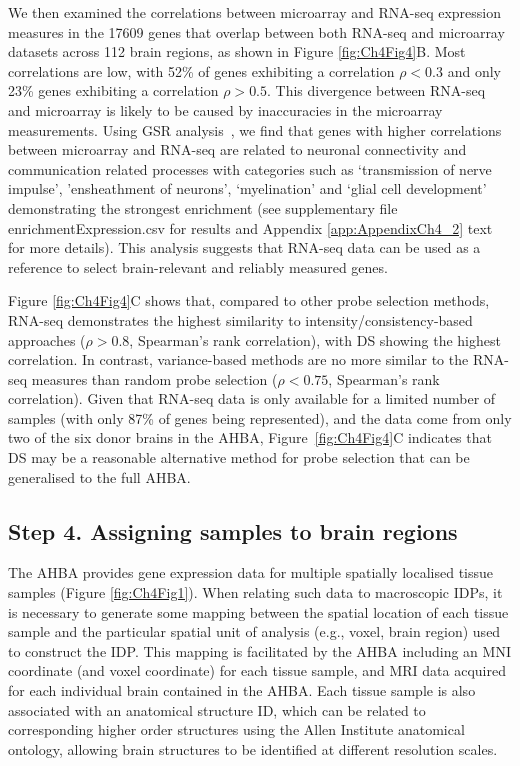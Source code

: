 We then examined the correlations between microarray and RNA-seq expression measures in the \num{17609} genes that overlap between both RNA-seq and microarray datasets across 112 brain regions, as shown in Figure \ref{fig:Ch4Fig4}B. Most correlations are low, with 52\% of genes exhibiting a correlation $\rho < 0.3$ and only 23\% genes exhibiting a correlation $\rho > 0.5$. This divergence between RNA-seq and microarray is likely to be caused by inaccuracies in the microarray measurements. Using GSR \mbox{analysis \citep{Gillis2010}}, we find that genes with higher correlations between microarray and RNA-seq are related to neuronal connectivity and communication related processes with categories such as ‘transmission of nerve impulse’, ’ensheathment of neurons’, ‘myelination’ and ‘glial cell development’ demonstrating the strongest enrichment (see supplementary file enrichmentExpression.csv for results and Appendix \ref{app:AppendixCh4_2} text for more details). This analysis suggests that RNA-seq data can be used as a reference to select brain-relevant and reliably measured genes.

Figure \ref{fig:Ch4Fig4}C shows that, compared to other probe selection methods, RNA-seq demonstrates the highest similarity to intensity/consistency-based approaches ($\rho > 0.8$, Spearman's rank correlation), with DS showing the highest correlation. In contrast, variance-based methods are no more similar to the RNA-seq measures than random probe selection ($\rho < 0.75$, Spearman's rank correlation). Given that RNA-seq data is only available for a limited number of samples (with only 87\% of genes being represented), and the data come from only two of the six donor brains in the AHBA, \mbox{Figure \ref{fig:Ch4Fig4}C} indicates that DS may be a reasonable alternative method for probe selection that can be generalised to the full AHBA.

\subsection{Step 4. Assigning samples to brain regions}

The AHBA provides gene expression data for multiple spatially localised tissue samples (Figure \ref{fig:Ch4Fig1}). When relating such data to macroscopic IDPs, it is necessary to generate some mapping between the spatial location of each tissue sample and the particular spatial unit of analysis (e.g., voxel, brain region) used to construct the IDP. This mapping is facilitated by the AHBA including an MNI coordinate (and voxel coordinate) for each tissue sample, and MRI data acquired for each individual brain contained in the AHBA. Each tissue sample is also associated with an anatomical structure ID, which can be related to corresponding higher order structures using the Allen Institute anatomical ontology, allowing brain structures to be identified at different resolution scales.

